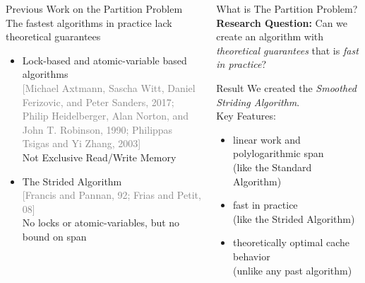 \documentclass[table,serif,mathserif,final]{beamer}
\newcommand{\citefont}[1]{{\huge \textcolor{gray}{#1}}}
\theoremstyle{remark}
\begin{document}
\begin{frame}{}
\begin{columns}[t]
\begin{column}{0.5\linewidth}
\begin{block}{\Huge Previous Work on the Partition Problem}
  The {\color{darkgreen}fastest algorithms in practice} {\color{red}lack theoretical guarantees}
	\begin{itemize}
		\item Lock-based and atomic-variable based algorithms\\ \citefont{[Michael Axtmann, Sascha Witt, Daniel Ferizovic, and Peter Sanders, 2017; Philip Heidelberger, Alan Norton, and John T. Robinson, 1990; Philippas Tsigas and Yi Zhang, 2003]}\\
      {\color{red} Not Exclusive Read/Write Memory}
		\item The Strided Algorithm\\ \citefont{[Francis and Pannan, 92; Frias and Petit, 08]}\\ 
      {\color{darkgreen}No locks or atomic-variables,} {\color{red}but no bound on span}
	\end{itemize}
	\vspace{0.2cm}

\end{block}
  \end{column}

  \begin{column}{0.5\linewidth}
\begin{block}{\Huge What is The Partition Problem?}
  \justifying
  \Huge \textbf{Research Question:} Can we create an algorithm with \emph{theoretical guarantees} that is \emph{fast in practice}?
\end{block}

\begin{block}{\Huge Result}
  \justifying
  \Huge We created the \emph{Smoothed Striding Algorithm}. \\
  Key Features:
	\begin{itemize}
		\item linear work and polylogarithmic span \\
			{\color{blue} (like the Standard Algorithm)\\}
		\vspace{0.15cm}
		\item fast in practice \\
			{\color{blue} (like the Strided Algorithm)\\}
	\vspace{0.15cm}
		\item theoretically optimal cache behavior \\
			{\color{blue} (unlike any past algorithm)}
	\end{itemize}
\end{block}


\end{column}
\end{columns}
\end{frame}
\end{document}
